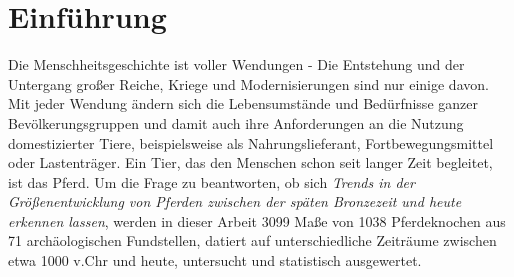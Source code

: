 \section{Einführung}

Die Menschheitsgeschichte ist voller Wendungen - Die Entstehung und der Untergang großer Reiche, Kriege und Modernisierungen sind nur einige davon.
Mit jeder Wendung ändern sich die Lebensumstände und Bedürfnisse ganzer Bevölkerungsgruppen und damit auch ihre Anforderungen an die Nutzung domestizierter Tiere, beispielsweise als Nahrungslieferant, Fortbewegungsmittel oder Lastenträger. 
Ein Tier, das den Menschen schon seit langer Zeit begleitet, ist das Pferd.
Um die Frage zu beantworten, ob sich \textit{Trends in der Größenentwicklung von Pferden zwischen der späten Bronzezeit und heute erkennen lassen}, werden in dieser Arbeit 3099 Maße von 1038 Pferdeknochen aus 71 archäologischen Fundstellen, datiert auf unterschiedliche Zeiträume zwischen etwa 1000 v.Chr und heute, untersucht und statistisch ausgewertet.